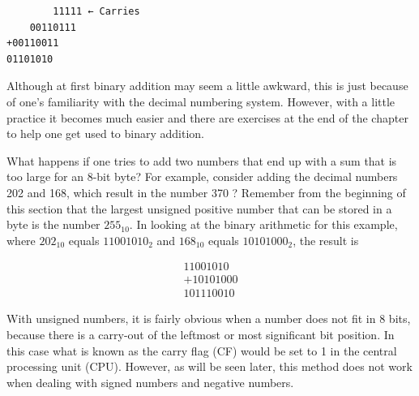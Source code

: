 \documentclass[10pt]{article}
\begin{document}
\begin{verbatim}
        11111 ← Carries
    00110111
+00110011
01101010
\end{verbatim}

Although at first binary addition may seem a little awkward, this is just because of one's familiarity with the decimal numbering system. However, with a little practice it becomes much easier and there are exercises at the end of the chapter to help one get used to binary addition.

What happens if one tries to add two numbers that end up with a sum that is too large for an 8-bit byte? For example, consider adding the decimal numbers 202 and 168, which result in the number 370 ? Remember from the beginning of this section that the largest unsigned positive number that can be stored in a byte is the number $255_{10}$. In looking at the binary arithmetic for this example, where $202_{10}$ equals $11001010_{2}$ and $168_{10}$ equals $10101000_{2}$, the result is

$$
\begin{array}{r}
11001010 \\
+10101000 \\
\hline 101110010
\end{array}
$$

With unsigned numbers, it is fairly obvious when a number does not fit in 8 bits, because there is a carry-out of the leftmost or most significant bit position. In this case what is known as the carry flag (CF) would be set to 1 in the central processing unit (CPU). However, as will be seen later, this method does not work when dealing with signed numbers and negative numbers.
\end{document}
